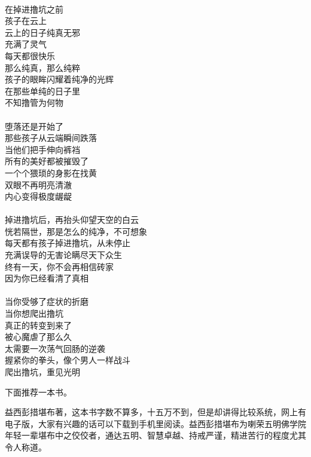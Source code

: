 \begin{poem}[云上的日子]
    \begin{multicols}{2}
        \centering~\\
        在掉进撸坑之前 \\ 孩子在云上 \\ 云上的日子纯真无邪 \\ 充满了灵气 \\ 每天都很快乐 \\ 那么纯真，那么纯粹 \\ 孩子的眼眸闪耀着纯净的光辉 \\ 在那些单纯的日子里 \\ 不知撸管为何物 \\~\\
        堕落还是开始了 \\ 那些孩子从云端瞬间跌落 \\ 当他们把手伸向裤裆 \\ 所有的美好都被摧毁了 \\ 一个个猥琐的身影在找黄 \\ 双眼不再明亮清澈 \\ 内心变得极度龌龊 \\~\\
        掉进撸坑后，再抬头仰望天空的白云 \\ 恍若隔世，那是怎么的纯净，不可想象 \\ 每天都有孩子掉进撸坑，从未停止 \\ 充满误导的无害论瞒尽天下众生 \\ 终有一天，你不会再相信砖家 \\ 因为你已经看清了真相 \\~\\
        当你受够了症状的折磨 \\ 当你想爬出撸坑 \\ 真正的转变到来了 \\ 被心魔虐了那么久 \\ 太需要一次荡气回肠的逆袭 \\ 握紧你的拳头，像个男人一样战斗 \\ 爬出撸坑，重见光明
    \end{multicols}
\end{poem}

下面推荐一本书。

\begin{book}[《因果明镜论》]
    益西彭措堪布著，这本书字数不算多，十五万不到，但是却讲得比较系统，网上有电子版，大家有兴趣的话可以下载到手机里阅读。益西彭措堪布为喇荣五明佛学院年轻一辈堪布中之佼佼者，通达五明、智慧卓越、持戒严谨，精进苦行的程度尤其令人称道。
\end{book}
